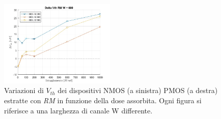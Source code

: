\documentclass[12pt, letterpaper]{book}
\begin{document}
\begin{figure}[H]
  \includegraphics[width=0.49\textwidth]{sovrapposizione-deltaVth-RM-P600}
  \caption{Variazioni di $V_{th}$ dei dispositivi NMOS (a sinistra) PMOS (a destra) estratte con \emph{RM} in funzione della dose assorbita. Ogni figura si riferisce a una larghezza di canale W differente.}
\end{figure}
\end{document}
